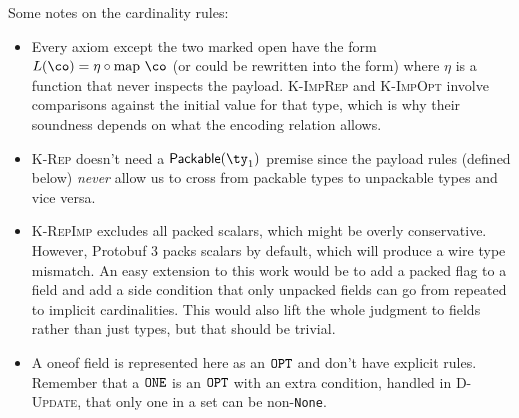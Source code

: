 Some notes on the cardinality rules:
\begin{itemize}
\item Every axiom except the two marked open have the form
  $L(\co) = \eta \circ \mathrm{map}\ \co$ (or could be rewritten into the form) where
  $\eta$ is a function that never inspects the payload. \textsc{K-ImpRep} and
  \textsc{K-ImpOpt} involve comparisons against the initial value for that type,
  which is why their soundness depends on what the encoding relation allows.
\item \textsc{K-Rep} doesn't need a $\packable(\ty_1)$ premise since the payload
  rules (defined below) \emph{never} allow us to cross from packable types to
  unpackable types and vice versa.
\item \textsc{K-RepImp} excludes all packed scalars, which might be overly
  conservative. However, Protobuf 3 packs scalars by default, which will produce
  a wire type mismatch. An easy extension to this work would be to add a packed
  flag to a field and add a side condition that only unpacked fields can go from
  repeated to implicit cardinalities. This would also lift the whole judgment to
  fields rather than just types, but that should be trivial.
\item A oneof field is represented here as an $\mathtt{OPT}$ and don't have explicit
  rules. Remember that a $\mathtt{ONE}$ is an $\mathtt{OPT}$ with an extra condition, handled in
  \textsc{D-Update}, that only one in a set can be non-\texttt{None}.
\end{itemize}

